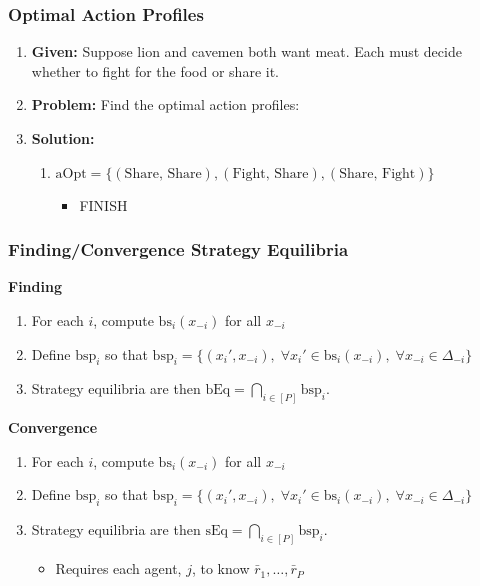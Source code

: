 \subsubsection{Optimal Action Profiles}
\begin{example}
    \begin{enumerate}
        \item \textbf{Given:} Suppose lion and cavemen both want meat. Each must decide whether to fight for the food or share it. 
        \item \textbf{Problem:} Find the optimal action profiles: 
        \item \textbf{Solution:}
        \begin{enumerate}
            \item $\text{aOpt} = \{(\text{Share, Share}), (\text{Fight, Share}), (\text{Share, Fight})\}$
            \begin{itemize}
                \item FINISH
            \end{itemize}
        \end{enumerate}
    \end{enumerate}
\end{example}
\newpage

\subsubsection{Finding/Convergence Strategy Equilibria}
\begin{process} \textbf{Finding}
    \begin{enumerate}
        \item For each $i$, compute $\text{bs}_i (x_{-i})$ for all $x_{-i}$
        \item Define $\text{bsp}_i$ so that $\text{bsp}_i = \{(x_i',x_{-i}), \; \forall x_i' \in \text{bs}_i (x_{-i}), \; \forall x_{-i} \in \Delta_{-i}\}$
        \item Strategy equilibria are then $\text{bEq} = \bigcap_{i\in [P]} \text{bsp}_i$.
    \end{enumerate}
\end{process}

\begin{process} \textbf{Convergence}
    \begin{enumerate}
        \item For each $i$, compute $\text{bs}_i (x_{-i})$ for all $x_{-i}$
        \item Define $\text{bsp}_i$ so that $\text{bsp}_i = \{(x_i',x_{-i}), \; \forall x_i' \in \text{bs}_i (x_{-i}), \; \forall x_{-i} \in \Delta_{-i}\}$
        \item Strategy equilibria are then $\text{sEq} = \bigcap_{i\in [P]} \text{bsp}_i$.
        \begin{itemize}
            \item Requires each agent, $j$, to know $\bar{r}_1,\ldots,\bar{r}_P$
        \end{itemize}
    \end{enumerate}
\end{process}
\newpage

